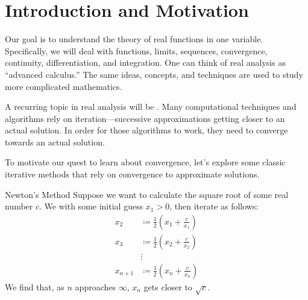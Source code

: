 \chapter{Introduction and Motivation}
Our goal is to understand the theory of real functions in one variable. Specifically, we will deal with functions, limits, sequences, convergence, continuity, differentiation, and integration. One can think of real analysis as ``advanced calculus.'' The same ideas, concepts, and techniques are used to study more complicated mathematics.

A recurring topic in real analysis will be . Many computational techniques and algorithms rely on iteration---successive approximations getting closer to an actual solution. In order for those algorithms to work, they need to converge towards an actual solution.

To motivate our quest to learn about convergence, let's explore some classic iterative methods that rely on convergence to approximate solutions.



\begin{exbox}{Newton's Method}{}
    Suppose we want to calculate the square root of some real number $c$. We with some initial guess $x_1 > 0$, then iterate as follows:
    \begin{align*}
        x_2 &\coloneq \frac{1}{2} \left( x_1 + \frac{c}{x_1} \right) \\
        x_3 &\coloneq \frac{1}{2} \left( x_2 + \frac{c}{x_2} \right) \\
        &\vdots \\
        x_{n+1} &\coloneq \frac{1}{2} \left( x_n + \frac{c}{x_n} \right)
    \end{align*}
    We find that, as $n$ approaches $\infty$, $x_n$ gets closer to $\sqrt{c}$.
\end{exbox}

